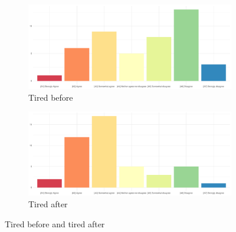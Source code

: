\begin{figure}
	\centering
	\begin{subfigure}{0.48\textwidth}
		\includegraphics[width=\textwidth]{./_StudyResults/tiredBefore}
		\caption{Tired before}
		\label{fig:tiredBefore}
	\end{subfigure}%
	\hfill
	\begin{subfigure}{0.48\textwidth}
		\includegraphics[width=\textwidth]{./_StudyResults/tiredAfter}
		\caption{Tired after}
		\label{fig:tiredAfter}
	\end{subfigure}
	\caption{Tired before and tired after} %
\end{figure}

